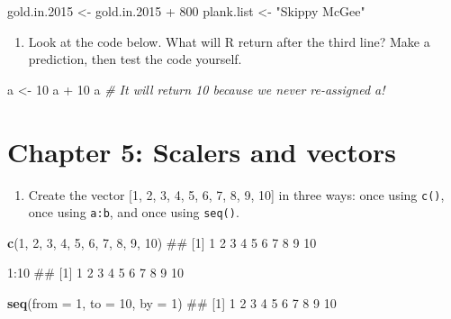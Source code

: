 \documentclass[]{book}
\newenvironment{Shaded}{\begin{snugshade}}{\end{snugshade}}
\newcommand{\KeywordTok}[1]{\textcolor[rgb]{0.13,0.29,0.53}{\textbf{{#1}}}}
\newcommand{\DataTypeTok}[1]{\textcolor[rgb]{0.13,0.29,0.53}{{#1}}}
\newcommand{\DecValTok}[1]{\textcolor[rgb]{0.00,0.00,0.81}{{#1}}}
\newcommand{\FloatTok}[1]{\textcolor[rgb]{0.00,0.00,0.81}{{#1}}}
\newcommand{\StringTok}[1]{\textcolor[rgb]{0.31,0.60,0.02}{{#1}}}
\newcommand{\CommentTok}[1]{\textcolor[rgb]{0.56,0.35,0.01}{\textit{{#1}}}}
\newcommand{\NormalTok}[1]{{#1}}
\providecommand{\tightlist}{%
  \setlength{\itemsep}{0pt}\setlength{\parskip}{0pt}}
\theoremstyle{definition}
\theoremstyle{definition}
\theoremstyle{remark}
\begin{document}
\begin{Shaded}
\begin{Highlighting}[]
\NormalTok{gold.in}\FloatTok{.2015} \NormalTok{<-}\StringTok{ }\NormalTok{gold.in}\FloatTok{.2015} \NormalTok{+}\StringTok{ }\DecValTok{800}
\NormalTok{plank.list <-}\StringTok{ "Skippy McGee"}
\end{Highlighting}
\end{Shaded}

\begin{enumerate}
\def\labelenumi{\arabic{enumi}.}
\setcounter{enumi}{4}
\tightlist
\item
  Look at the code below. What will R return after the third line? Make
  a prediction, then test the code yourself.
\end{enumerate}

\begin{Shaded}
\begin{Highlighting}[]
\NormalTok{a <-}\StringTok{ }\DecValTok{10}
\NormalTok{a +}\StringTok{ }\DecValTok{10}
\NormalTok{a       }\CommentTok{# It will return 10 because we never re-assigned a!}
\end{Highlighting}
\end{Shaded}

\section{Chapter 5: Scalers and
vectors}\label{chapter-5-scalers-and-vectors}

\begin{enumerate}
\def\labelenumi{\arabic{enumi}.}
\tightlist
\item
  Create the vector {[}1, 2, 3, 4, 5, 6, 7, 8, 9, 10{]} in three ways:
  once using \texttt{c()}, once using \texttt{a:b}, and once using
  \texttt{seq()}.
\end{enumerate}

\begin{Shaded}
\begin{Highlighting}[]
\KeywordTok{c}\NormalTok{(}\DecValTok{1}\NormalTok{, }\DecValTok{2}\NormalTok{, }\DecValTok{3}\NormalTok{, }\DecValTok{4}\NormalTok{, }\DecValTok{5}\NormalTok{, }\DecValTok{6}\NormalTok{, }\DecValTok{7}\NormalTok{, }\DecValTok{8}\NormalTok{, }\DecValTok{9}\NormalTok{, }\DecValTok{10}\NormalTok{)}
\NormalTok{##  [1]  1  2  3  4  5  6  7  8  9 10}

\DecValTok{1}\NormalTok{:}\DecValTok{10}
\NormalTok{##  [1]  1  2  3  4  5  6  7  8  9 10}

\KeywordTok{seq}\NormalTok{(}\DataTypeTok{from =} \DecValTok{1}\NormalTok{, }\DataTypeTok{to =} \DecValTok{10}\NormalTok{, }\DataTypeTok{by =} \DecValTok{1}\NormalTok{)}
\NormalTok{##  [1]  1  2  3  4  5  6  7  8  9 10}
\end{Highlighting}
\end{Shaded}
\end{document}
